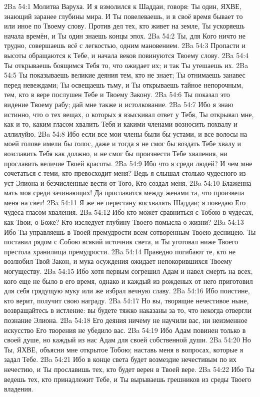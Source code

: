 \vs 2Ba 54:1
Молитва Варуха. И я взмолился к Шаддаи, говоря: Ты один, ЯХВЕ, знающий заранее глубины мира. И Ты повелеваешь, и в своё время бывает то или иное по Твоему слову. Против дел тех, кто живет на земле, Ты ускоряешь начала времён, и Ты один знаешь концы эпох.
\vs 2Ba 54:2
Ты, для Кого ничто не трудно, совершаешь всё с легкостью, одним мановением.
\vs 2Ba 54:3
Пропасти и высоты обращаются к Тебе, и начала веков повинуются Твоему слову.
\vs 2Ba 54:4
Ты открываешь боящимся Тебя то, что ожидает их; и так Ты утешаешь их.
\vs 2Ba 54:5
Ты показываешь великие деяния тем, кто не знает; Ты отнимаешь занавес перед невеждами; Ты освещаешь тьму, и Ты открываешь тайное непорочным, тем, кто в вере послушен Тебе и Твоему Закону.
\vs 2Ba 54:6
Ты показал это видение Твоему рабу; дай мне также и истолкование.
\vs 2Ba 54:7
Ибо я знаю истинно, что о тех вещах, о которых я взыскивал ответ у Тебя, Ты открывал мне, как и то, каким гласом хвалить Тебя и какими членами возносить похвалу и аллилуйю.
\vs 2Ba 54:8
Ибо если все мои члены были бы устами, и все волосы на моей голове имели бы голос, даже и тогда я не смог бы воздать Тебе хвалу и возславить Тебя как должно, и не смог бы произнести Тебе хваления, ни прославить величие Твоей красоты.
\vs 2Ba 54:9
Ибо что я среди людей? И чем мне сочетаться с теми, кто превосходит меня? Ведь я слышал столько чудесного из уст Элиона и безчисленные вести от Того, Кто создал меня.
\vs 2Ba 54:10
Блаженна мать моя среди зачинающих! Да прославится между женами та, что произвела меня на свет!
\vs 2Ba 54:11
Я же не перестану восхвалять Шаддаи; я поведаю Его чудеса гласом хваления.
\vs 2Ba 54:12
Ибо кто может сравниться с Тобою в чудесах, как Твои, о Боже? Кто изследует глубину Твоего помысла о жизни?
\vs 2Ba 54:13
Ибо Ты управляешь в Твоей премудрости всем сотворенным Твоею десницею. Ты поставил рядом с Собою всякий источник света, и Ты уготовал ниже Твоего престола хранилища премудрости.
\vs 2Ba 54:14
Праведно погибают те, кто не возлюбил Твой Закон, и мука осуждения ожидает непокорившихся Твоему могуществу.
\vs 2Ba 54:15
Ибо хотя первым согрешил Адам и навел смерть на всех, кого еще не было в его время, однако и каждый из рожденых от него приготовил для себя грядущую муку или же избрал вечную славу.
\vs 2Ba 54:16
Ибо поистине, кто верит, получит свою награду.
\vs 2Ba 54:17
Но вы, творящие нечестивое ныне, возвращайтесь в истление: вы будете тяжко наказаны за то, что некогда отвергли познание Элиона.
\vs 2Ba 54:18
Его деяния ничему не научили вас, ни неизменное искусство Его творения не убедило вас.
\vs 2Ba 54:19
Ибо Адам повинен только в своей душе, но каждый из нас Адам для своей собственной души.
\vs 2Ba 54:20
Но Ты, ЯХВЕ, объясни мне открытое Тобою; наставь меня в вопросах, которые я задал Тебе.
\vs 2Ba 54:21
Ибо в конце света будет возмездие нечестивым по их нечестию, и Ты прославишь тех, кто будет верен в Твоей вере.
\vs 2Ba 54:22
Ибо Ты ведешь тех, кто принадлежит Тебе, и Ты вырываешь грешников из среды Твоего владения.

